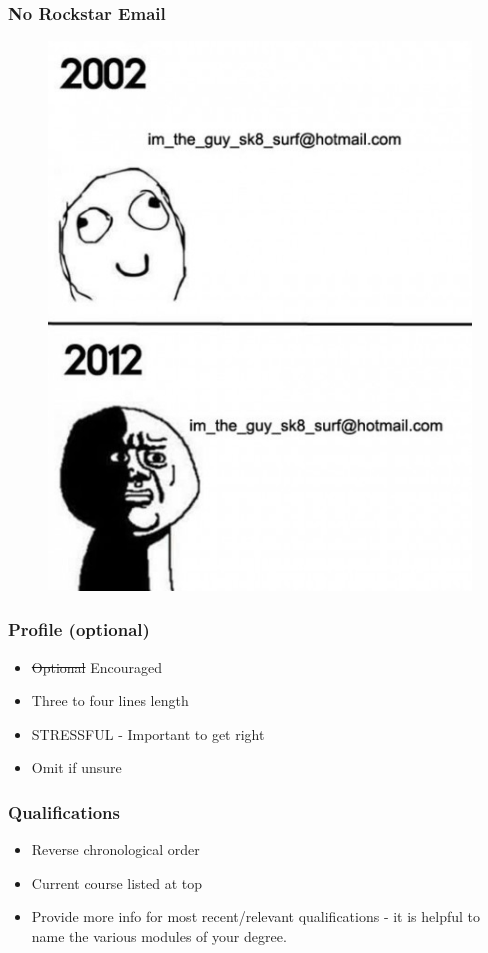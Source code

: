 \begin{frame}
	\frametitle{No Rockstar Email}
	\begin{figure}
		\includegraphics[scale=.3]{assets/email}
	\end{figure}
\end{frame}

\begin{frame}
	\frametitle{Profile (optional)}
	\begin{itemize}
		\item \st{Optional} Encouraged 
		\item Three to four lines length
		\item STRESSFUL - Important to get right
		\item Omit if unsure
	\end{itemize}
\end{frame}

\begin{frame} 
	\frametitle{Qualifications}
	\begin{itemize}
		\item Reverse chronological order
		\item Current course listed at top
		\item Provide more info for most recent/relevant qualifications - it is helpful to name the various modules of your degree. 
	\end{itemize}
\end{frame}

